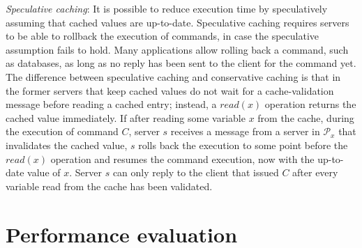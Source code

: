 \documentclass[11pt]{article}
\newcommand{\ppm}{\mathcal{P}}
\begin{document}
\emph{Speculative caching}: It is possible to reduce execution time by speculatively assuming that cached values are up-to-date.
Speculative caching requires servers to be able to rollback the execution of commands, in case the speculative assumption fails to hold.
Many applications allow rolling back a command, such as databases, as long as no reply has been sent to the client for the command yet.
The difference between speculative caching and conservative caching is that in the former servers that keep cached values do not wait for a cache-validation message before reading a cached entry; instead, a $read(x)$ operation returns the cached value immediately.
If after reading some variable $x$ from the cache, during the execution of command $C$, server $s$ receives a message from a server in $\ppm_x$ that invalidates the cached value, $s$ rolls back the execution to some point before the $read(x)$ operation and resumes the command execution, now with the up-to-date value of $x$.
Server $s$ can only reply to the client that issued $C$ after every variable read from the cache has been validated.



\section{Performance evaluation}
\label{sec:perfeval}
\end{document}
